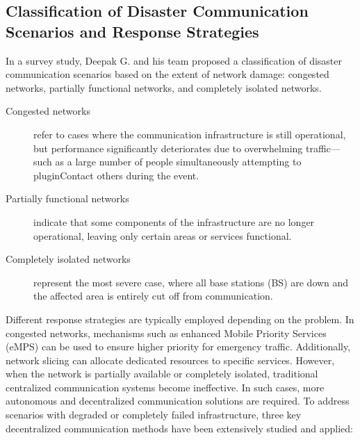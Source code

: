 \subsection{Classification of Disaster Communication Scenarios and Response Strategies}
    In a survey study, Deepak G. and his team proposed a classification of disaster communication scenarios based on the extent of network damage: congested networks, partially functional networks, and completely isolated networks.
    \begin{description}
        \item[Congested networks] refer to cases where the communication infrastructure is still operational, but performance significantly deteriorates due to overwhelming traffic—such as a large number of people simultaneously attempting to pluginContact others during the event.
        \sloppy\item[Partially functional networks] indicate that some components of the infrastructure are no longer operational, leaving only certain areas or services functional.
        \sloppy\item[Completely isolated networks] represent the most severe case, where all base stations (BS) are down and the affected area is entirely cut off from communication.
    \end{description}
    Different response strategies are typically employed depending on the problem. In congested networks, mechanisms such as enhanced Mobile Priority Services (eMPS) can be used to ensure higher priority for emergency traffic. Additionally, network slicing can allocate dedicated resources to specific services. However, when the network is partially available or completely isolated, traditional centralized communication systems become ineffective. In such cases, more autonomous and decentralized communication solutions are required. To address scenarios with degraded or completely failed infrastructure, three key decentralized communication methods have been extensively studied and applied:

